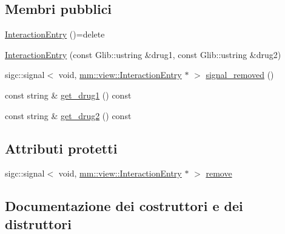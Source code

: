 \subsection*{Membri pubblici}
\begin{DoxyCompactItemize}
\item 
\mbox{\hyperlink{classmm_1_1view_1_1_interaction_entry_a6ee26295e5dd8871a0cf801014a8cc34}{Interaction\+Entry}} ()=delete
\item 
\mbox{\hyperlink{classmm_1_1view_1_1_interaction_entry_a1e3a924b7b218109d2df6b4ebbc557f0}{Interaction\+Entry}} (const Glib\+::ustring \&drug1, const Glib\+::ustring \&drug2)
\item 
sigc\+::signal$<$ void, \mbox{\hyperlink{classmm_1_1view_1_1_interaction_entry}{mm\+::view\+::\+Interaction\+Entry}} $\ast$ $>$ \mbox{\hyperlink{classmm_1_1view_1_1_interaction_entry_a48fc0d3c44a4d0b5364d822ebbdf07a1}{signal\+\_\+removed}} ()
\item 
const string \& \mbox{\hyperlink{classmm_1_1view_1_1_interaction_entry_a1f579cbaf213f6e602e8d2b67109a1c2}{get\+\_\+drug1}} () const
\item 
const string \& \mbox{\hyperlink{classmm_1_1view_1_1_interaction_entry_a58a4843226a5b149541eda7b1905eb85}{get\+\_\+drug2}} () const
\end{DoxyCompactItemize}
\subsection*{Attributi protetti}
\begin{DoxyCompactItemize}
\item 
sigc\+::signal$<$ void, \mbox{\hyperlink{classmm_1_1view_1_1_interaction_entry}{mm\+::view\+::\+Interaction\+Entry}} $\ast$ $>$ \mbox{\hyperlink{classmm_1_1view_1_1_interaction_entry_ac17d59c180df431cfffd90501d6845ef}{remove}}
\end{DoxyCompactItemize}


\subsection{Documentazione dei costruttori e dei distruttori}
\mbox{\label{classmm_1_1view_1_1_interaction_entry_a6ee26295e5dd8871a0cf801014a8cc34}} 
